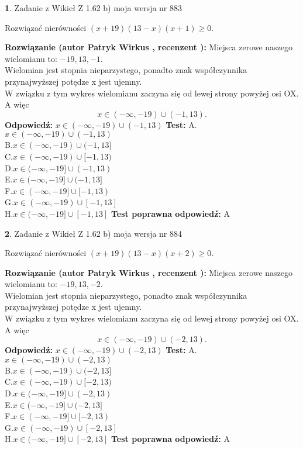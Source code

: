 \documentclass[12pt, a4paper]{article}
\theoremstyle{definition} %
\newtheorem{zad}{}
\newcommand{\zadStart}[1]{\begin{zad}#1\newline}
\newcommand{\zadStop}{\end{zad}}
\newcommand{\rozwStart}[2]{\noindent \textbf{Rozwiązanie (autor #1 , recenzent #2): }\newline}
\newcommand{\rozwStop}{\newline}
\newcommand{\odpStart}{\noindent \textbf{Odpowiedź:}\newline}
\newcommand{\odpStop}{\newline}
\newcommand{\testStart}{\noindent \textbf{Test:}\newline}
\newcommand{\testStop}{\newline}
\newcommand{\kluczStart}{\noindent \textbf{Test poprawna odpowiedź:}\newline}
\newcommand{\kluczStop}{\newline}
\begin{document}
\zadStart{Zadanie z Wikieł Z 1.62 b) moja wersja nr 883}

Rozwiązać nierówności $(x+19)(13-x)(x+1)\ge0$.
\zadStop
\rozwStart{Patryk Wirkus}{}
Miejsca zerowe naszego wielomianu to: $-19, 13, -1$.\\
Wielomian jest stopnia nieparzystego, ponadto znak współczynnika przy\linebreak najwyższej potędze x jest ujemny.\\ W związku z tym wykres wielomianu zaczyna się od lewej strony powyżej osi OX. A więc $$x \in (-\infty,-19) \cup (-1,13).$$
\rozwStop
\odpStart
$x \in (-\infty,-19) \cup (-1,13)$
\odpStop
\testStart
A.$x \in (-\infty,-19) \cup (-1,13)$\\
B.$x \in (-\infty,-19) \cup (-1,13]$\\
C.$x \in (-\infty,-19) \cup [-1,13)$\\
D.$x \in (-\infty,-19] \cup (-1,13)$\\
E.$x \in (-\infty,-19] \cup (-1,13]$\\
F.$x \in (-\infty,-19] \cup [-1,13)$\\
G.$x \in (-\infty,-19) \cup [-1,13]$\\
H.$x \in (-\infty,-19] \cup [-1,13]$
\testStop
\kluczStart
A
\kluczStop



\zadStart{Zadanie z Wikieł Z 1.62 b) moja wersja nr 884}

Rozwiązać nierówności $(x+19)(13-x)(x+2)\ge0$.
\zadStop
\rozwStart{Patryk Wirkus}{}
Miejsca zerowe naszego wielomianu to: $-19, 13, -2$.\\
Wielomian jest stopnia nieparzystego, ponadto znak współczynnika przy\linebreak najwyższej potędze x jest ujemny.\\ W związku z tym wykres wielomianu zaczyna się od lewej strony powyżej osi OX. A więc $$x \in (-\infty,-19) \cup (-2,13).$$
\rozwStop
\odpStart
$x \in (-\infty,-19) \cup (-2,13)$
\odpStop
\testStart
A.$x \in (-\infty,-19) \cup (-2,13)$\\
B.$x \in (-\infty,-19) \cup (-2,13]$\\
C.$x \in (-\infty,-19) \cup [-2,13)$\\
D.$x \in (-\infty,-19] \cup (-2,13)$\\
E.$x \in (-\infty,-19] \cup (-2,13]$\\
F.$x \in (-\infty,-19] \cup [-2,13)$\\
G.$x \in (-\infty,-19) \cup [-2,13]$\\
H.$x \in (-\infty,-19] \cup [-2,13]$
\testStop
\kluczStart
A
\kluczStop
\end{document}
